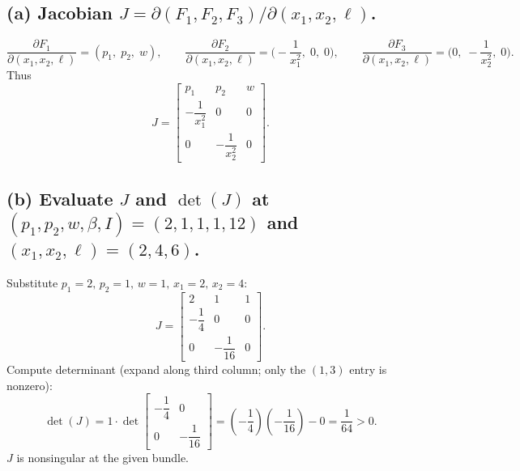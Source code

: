 \documentclass[12pt]{article}
\begin{document}
\begin{enumerate}
\subsection*{(a) Jacobian $J=\partial(F_1,F_2,F_3)/\partial(x_1,x_2,\ell)$.}
\[
\frac{\partial F_1}{\partial (x_1,x_2,\ell)}=(p_1,\; p_2,\; w),\qquad
\frac{\partial F_2}{\partial (x_1,x_2,\ell)}=\Big(-\frac{1}{x_1^2},\; 0,\; 0\Big),\qquad
\frac{\partial F_3}{\partial (x_1,x_2,\ell)}=\Big(0,\; -\frac{1}{x_2^2},\; 0\Big).
\]
Thus
\[
\boxed{\;
J=\begin{bmatrix}
p_1 & p_2 & w\\[2pt]
-\dfrac{1}{x_1^2} & 0 & 0\\[6pt]
0 & -\dfrac{1}{x_2^2} & 0
\end{bmatrix}.
\;}
\]

\subsection*{(b) Evaluate $J$ and $\det(J)$ at $(p_1,p_2,w,\beta,I)=(2,1,1,1,12)$ and $(x_1,x_2,\ell)=(2,4,6)$.}
Substitute $p_1=2,\,p_2=1,\,w=1,\,x_1=2,\,x_2=4$:
\[
J=\begin{bmatrix}
2 & 1 & 1\\[2pt]
-\dfrac{1}{4} & 0 & 0\\[6pt]
0 & -\dfrac{1}{16} & 0
\end{bmatrix}.
\]
Compute determinant (expand along third column; only the $(1,3)$ entry is nonzero):
\[
\det(J) = 1\cdot \det\begin{bmatrix}
-\dfrac{1}{4} & 0\\[4pt]
0 & -\dfrac{1}{16}
\end{bmatrix}
= \left(-\frac{1}{4}\right)\left(-\frac{1}{16}\right)-0
= \frac{1}{64} > 0.
\]
$J$ is nonsingular at the given bundle.


\end{enumerate}
\end{document}
